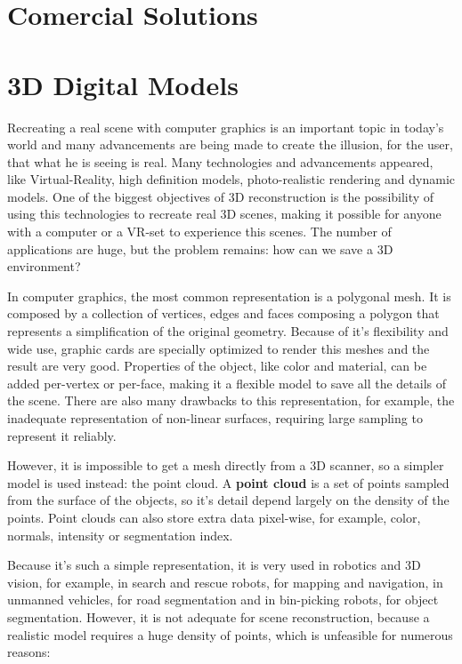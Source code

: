 \section{Comercial Solutions}

\section{3D Digital Models}

Recreating a real scene with computer graphics is an important topic in today's world and many advancements are being made to create the illusion, for the user, that what he is seeing is real. Many technologies and advancements appeared, like Virtual-Reality, high definition models, photo-realistic rendering and dynamic models. One of the biggest objectives of 3D reconstruction is the possibility of using this technologies to recreate real 3D scenes, making it possible for anyone with a computer or a VR-set to experience this scenes. The number of applications are huge, but the problem remains: how can we save a 3D environment?

In computer graphics, the most common representation is a polygonal mesh. It is composed by a collection of vertices, edges and faces composing a polygon that represents a simplification of the original geometry. Because of it's flexibility and wide use, graphic cards are specially optimized to render this meshes and the result are very good. Properties of the object, like color and material, can be added per-vertex or per-face, making it a flexible model to save all the details of the scene. There are also many drawbacks to this representation, for example, the inadequate representation of non-linear surfaces, requiring large sampling to represent it reliably.

However, it is impossible to get a mesh directly from a 3D scanner, so a simpler model is used instead: the point cloud. A \textbf{point cloud} is a set of points sampled from the surface of the objects, so it's detail depend largely on the density of the points. Point clouds can also store extra data pixel-wise, for example, color, normals, intensity or segmentation index.

Because it's such a simple representation, it is very used in robotics and 3D vision, for example, in search and rescue robots, for mapping and navigation, in unmanned vehicles, for road segmentation and in bin-picking robots, for object segmentation. However, it is not adequate for scene reconstruction, because a realistic model requires a huge density of points, which is unfeasible for numerous reasons:

